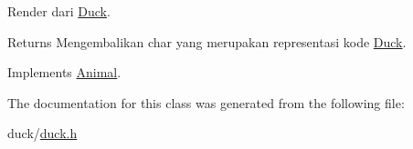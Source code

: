Render dari \hyperlink{classDuck}{Duck}. 

\begin{DoxyReturn}{Returns}
Mengembalikan char yang merupakan representasi kode \hyperlink{classDuck}{Duck}. 
\end{DoxyReturn}


Implements \hyperlink{classAnimal_a43a47c0f41d211128e04abc6add53def}{Animal}.



The documentation for this class was generated from the following file\+:\begin{DoxyCompactItemize}
\item 
duck/\hyperlink{duck_8h}{duck.\+h}\end{DoxyCompactItemize}

